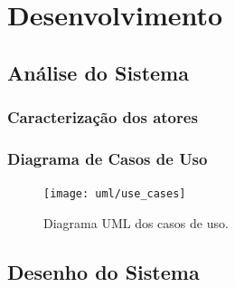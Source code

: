 \documentclass[12pt,a4paper,openright,oneside]{memoir}
\begin{document}
\chapter{Desenvolvimento}
\label{ch:dev}


\section{Análise do Sistema}
\label{ch:analysis}


\subsection{Caracterização dos atores}


\subsection{Diagrama de Casos de Uso}


\begin{figure}[H]
  \centering
  \texttt{[image: uml/use\_cases]}
  \caption{Diagrama UML dos casos de uso.}
  \label{fig:use_cases}
\end{figure}

\section{Desenho do Sistema}
\label{ch:design}
\end{document}
